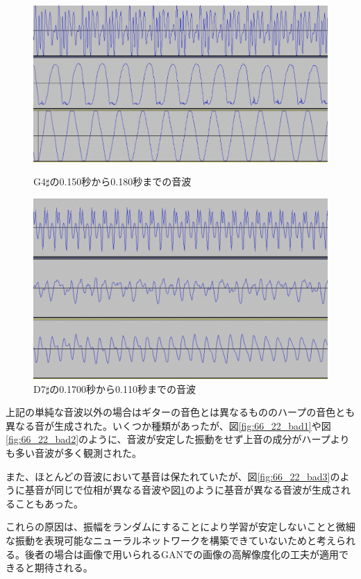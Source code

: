 \begin{figure}[t]
\begin{center}
\begin{minipage}{0.48\hsize}
\begin{center}
\includegraphics[width=0.9\hsize]{figure/66_22_det/g4s_0150_0180.png}
\caption{G4$\sharp$の0.150秒から0.180秒までの音波}
\label{fig:66_22_bad3}
\end{center}
\end{minipage}
\begin{minipage}{0.48\hsize}
\begin{center}
\includegraphics[width=0.9\hsize]{figure/66_22_det/d7s_0100_0110.png}
\caption{D7$\sharp$の0.1700秒から0.110秒までの音波}
\label{fig:66_22_bad4}
\end{center}
\end{minipage}
\end{center}
\end{figure}

上記の単純な音波以外の場合はギターの音色とは異なるもののハープの音色とも異なる音が生成された。いくつか種類があったが、図\ref{fig:66_22_bad1}や図\ref{fig:66_22_bad2}のように、音波が安定した振動をせず上音の成分がハープよりも多い音波が多く観測された。

また、ほとんどの音波において基音は保たれていたが、図\ref{fig:66_22_bad3}のように基音が同じで位相が異なる音波や図\ref{fig:66_22_bad4}のように基音が異なる音波が生成されることもあった。

これらの原因は、振幅をランダムにすることにより学習が安定しないことと微細な振動を表現可能なニューラルネットワークを構築できていないためと考えられる。後者の場合は画像で用いられるGANでの画像の高解像度化の工夫が適用できると期待される。